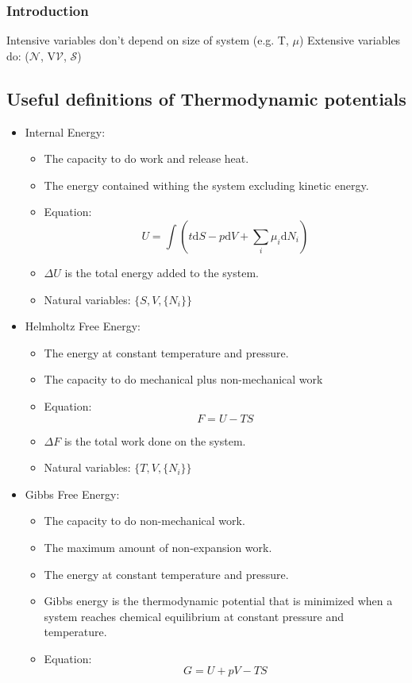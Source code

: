 \documentclass[11pt]{article}
\begin{document}
\subsubsection{Introduction}
\label{sec:orgfede7d4}
Intensive variables don't depend on size of system (e.g. T, \(\mu\))
Extensive variables do: (\(\mathcal{N}\), V\(\mathcal{V}\), \(\mathcal{S}\))
\subsection{Useful definitions of Thermodynamic potentials}
\label{sec:org2a40070}
\begin{itemize}
\item Internal Energy:
\begin{itemize}
\item The capacity to do work and release heat.
\item The energy contained withing the system excluding kinetic energy.
\item Equation: \[ U = \int ( t\text{d}S -p\text{d}V + \sum_{i}\mu_{i}\text{d}N_{i} ) \]
\item \(\Delta U\) is the total energy added to the system.
\item Natural variables: \(\{ S, V, \{N_{i}\} \}\)
\end{itemize}
\item Helmholtz Free Energy:
\begin{itemize}
\item The energy at constant temperature and pressure.
\item The capacity to do mechanical plus non-mechanical work
\item Equation: \[ F = U - TS \]
\item \(\Delta F\) is the total work done on the system.
\item Natural variables: \(\{ T, V, \{N_{i}\} \}\)
\end{itemize}
\item Gibbs Free Energy:
\begin{itemize}
\item The capacity to do non-mechanical work.
\item The maximum amount of non-expansion work.
\item The energy at constant temperature and pressure.
\item Gibbs energy is the thermodynamic potential that is minimized when a
system reaches chemical equilibrium at constant pressure and
temperature.
\item Equation: \[ G = U + pV - TS  \]

\end{itemize}
\end{itemize}
\end{document}
